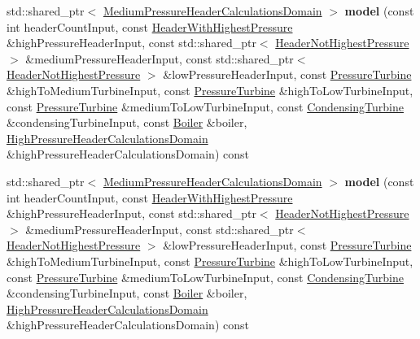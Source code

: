 \begin{DoxyCompactItemize}
std\+::shared\+\_\+ptr$<$ \hyperlink{class_medium_pressure_header_calculations_domain}{Medium\+Pressure\+Header\+Calculations\+Domain} $>$ {\bfseries model} (const int header\+Count\+Input, const \hyperlink{class_header_with_highest_pressure}{Header\+With\+Highest\+Pressure} \&high\+Pressure\+Header\+Input, const std\+::shared\+\_\+ptr$<$ \hyperlink{class_header_not_highest_pressure}{Header\+Not\+Highest\+Pressure} $>$ \&medium\+Pressure\+Header\+Input, const std\+::shared\+\_\+ptr$<$ \hyperlink{class_header_not_highest_pressure}{Header\+Not\+Highest\+Pressure} $>$ \&low\+Pressure\+Header\+Input, const \hyperlink{class_pressure_turbine}{Pressure\+Turbine} \&high\+To\+Medium\+Turbine\+Input, const \hyperlink{class_pressure_turbine}{Pressure\+Turbine} \&high\+To\+Low\+Turbine\+Input, const \hyperlink{class_pressure_turbine}{Pressure\+Turbine} \&medium\+To\+Low\+Turbine\+Input, const \hyperlink{class_condensing_turbine}{Condensing\+Turbine} \&condensing\+Turbine\+Input, const \hyperlink{class_boiler}{Boiler} \&boiler, \hyperlink{class_high_pressure_header_calculations_domain}{High\+Pressure\+Header\+Calculations\+Domain} \&high\+Pressure\+Header\+Calculations\+Domain) const
\item 
\mbox{\label{class_medium_pressure_header_modeler_aaf90331dd5cf8a0fb883be17de477904}} 
std\+::shared\+\_\+ptr$<$ \hyperlink{class_medium_pressure_header_calculations_domain}{Medium\+Pressure\+Header\+Calculations\+Domain} $>$ {\bfseries model} (const int header\+Count\+Input, const \hyperlink{class_header_with_highest_pressure}{Header\+With\+Highest\+Pressure} \&high\+Pressure\+Header\+Input, const std\+::shared\+\_\+ptr$<$ \hyperlink{class_header_not_highest_pressure}{Header\+Not\+Highest\+Pressure} $>$ \&medium\+Pressure\+Header\+Input, const std\+::shared\+\_\+ptr$<$ \hyperlink{class_header_not_highest_pressure}{Header\+Not\+Highest\+Pressure} $>$ \&low\+Pressure\+Header\+Input, const \hyperlink{class_pressure_turbine}{Pressure\+Turbine} \&high\+To\+Medium\+Turbine\+Input, const \hyperlink{class_pressure_turbine}{Pressure\+Turbine} \&high\+To\+Low\+Turbine\+Input, const \hyperlink{class_pressure_turbine}{Pressure\+Turbine} \&medium\+To\+Low\+Turbine\+Input, const \hyperlink{class_condensing_turbine}{Condensing\+Turbine} \&condensing\+Turbine\+Input, const \hyperlink{class_boiler}{Boiler} \&boiler, \hyperlink{class_high_pressure_header_calculations_domain}{High\+Pressure\+Header\+Calculations\+Domain} \&high\+Pressure\+Header\+Calculations\+Domain) const
\end{DoxyCompactItemize}


